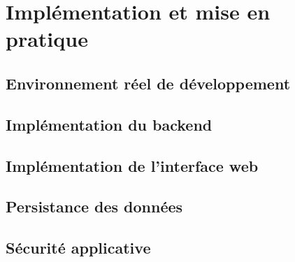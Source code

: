 \chapter{Implémentation et mise en pratique}
\label{chap:04-implementation-validation}
\clearpage

\section{Environnement réel de développement}
\label{sec:04-implementation-validation-1}

\section{Implémentation du backend}
\label{sec:04-implementation-validation-2}

\section{Implémentation de l'interface web}
\label{sec:04-implementation-validation-3}

\section{Persistance des données}
\label{sec:04-implementation-validation-4}

\section{Sécurité applicative}
\label{sec:04-implementation-validation-5}

